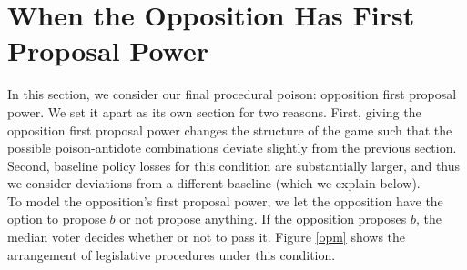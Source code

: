 \documentclass[12pt]{article}
\theoremstyle{plain}		      \newtheorem{assn}{Assumption}
\theoremstyle{plain}		      \newtheorem{prop}{Proposition}
\theoremstyle{plain}		      \newtheorem{lemma}{Lemma}
\theoremstyle{plain}	          \newtheorem{imp}{Implication}
\theoremstyle{plain}	          \newtheorem{hyp}{Hypothesis}
\theoremstyle{definition}		  \newtheorem{defn}{Definition}
\theoremstyle{remark}	          \newtheorem{rem}{Remark}
\theoremstyle{definition}         \newtheorem{case}{Case}
\begin{document}
\section{When the Opposition Has First Proposal Power}
\indent In this section, we consider our final procedural poison: opposition first proposal power. We set it apart as its own section for two reasons. First, giving the opposition first proposal power changes the structure of the game such that the possible poison-antidote combinations deviate slightly from the previous section. Second, baseline policy losses for this condition are substantially larger, and thus we consider deviations from a different baseline (which we explain below).  
\\
\indent To model the opposition's first proposal power, we let the opposition have the option to propose $b$ or not propose anything. If the opposition proposes $b$, the median voter decides whether or not to pass it. Figure \ref{opm} shows the arrangement of legislative procedures under this condition. 
\end{document}
